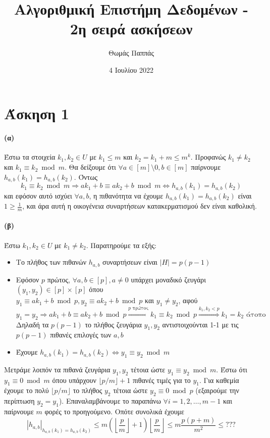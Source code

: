 \documentclass[a4paper,11pt]{article}
\newcommand{\RightarrowArg}[1]{\stackrel{#1}{\Longrightarrow}}
\begin{document}
\title{Αλγοριθμική Επιστήμη Δεδομένων - 2η σειρά ασκήσεων}
\author{Θωμάς Παππάς}
\date{4 Ιουλίου 2022}
\maketitle

\section*{Άσκηση 1}

\paragraph{(α)} Έστω τα στοιχεία $k_1,k_2 \in U$ με $k_1 \leq m$ και $k_2 = k_1+m \leq m^k$.
Προφανώς $k_1 \neq k_2$ και $k_1 \equiv k_2 \bmod m$.
Θα δείξουμε ότι $\forall a \in [m] \setminus 0, b \in [m]$ παίρνουμε $h_{a,b}(k_1) = h_{a,b}(k_2)$.
Όντως
\[k_1 \equiv k_2 \bmod m \Rightarrow ak_1+b \equiv ak_2+b \bmod m \Leftrightarrow h_{a,b}(k_1) = h_{a,b}(k_2)\]
και εφόσον αυτό ισχύει $\forall a, b$, η πιθανότητα να έχουμε $h_{a,b}(k_1) = h_{a,b}(k_2)$ είναι $1 \geq \frac1{m}$, και άρα αυτή η οικογένεια συναρτήσεων κατακερματισμού δεν είναι καθολική.

\paragraph{(β)} Έστω $k_1,k_2 \in U$ με $k_1 \neq k_2$. Παρατηρούμε τα εξής:

\begin{itemize}
	\item Το πλήθος των πιθανών $h_{a,b}$ συναρτήσεων είναι $|H|=p(p-1)$
	\item Εφόσον $p$ πρώτος, $\forall a,b \in [p], a \neq 0$ υπάρχει μοναδικό ζευγάρι $(y_1,y_2) \in [p] \times [p]$ όπου\\
		$y_1 \equiv ak_1+b \bmod p, y_2 \equiv ak_2+b \bmod p$ και $y_1 \neq y_2$, αφού
		\[y_1=y_2 \Rightarrow ak_1+b \equiv ak_2+b \bmod p \RightarrowArg{p \text{ πρώτος}} k_1 \equiv k_2 \bmod p \RightarrowArg{k_1,k_2<p} k_1=k_2 \text{ άτοπο}\]
		Δηλαδή τα $p(p-1)$ το πλήθος ζευγάρια $y_1,y_2$ αντιστοιχούνται 1-1 με τις $p(p-1)$ πιθανές επιλογές των $a,b$
	\item Έχουμε $h_{a,b}(k_1) = h_{a,b}(k_2) \Leftrightarrow y_1 \equiv y_2 \bmod m$
\end{itemize}
Μετράμε λοιπόν τα πιθανά ζευγάρια $y_1,y_2$ τέτοια ώστε $y_1 \equiv y_2 \bmod m$.
Έστω ότι $y_1 \equiv 0 \bmod m$ όπου υπάρχουν $\lfloor p/m \rfloor + 1$ πιθανές τιμές για το $y_1$. Για καθεμία έχουμε το πολύ $\lfloor p/m \rfloor$ το πλήθος $y_2$ τέτοια ώστε $y_2 \equiv 0 \bmod p$ (εξαιρούμε την περίπτωση $y_2=y_1$).
Επαναλαμβάνουμε το παραπάνω $\forall i = 1,2,\dots,m-1$ και παίρνουμε $m$ φορές το προηγούμενο.
Οπότε συνολικά έχουμε
\[
	|h_{a,b}|_{h_{a,b}(k_1)=h_{a,b}(k_2)} \leq m \left(\left\lfloor \frac{p}{m} \right\rfloor + 1\right) \left\lfloor \frac{p}{m} \right\rfloor \leq m \frac{p(p+m)}{m^2} \leq ??? %
\]
\end{document}
